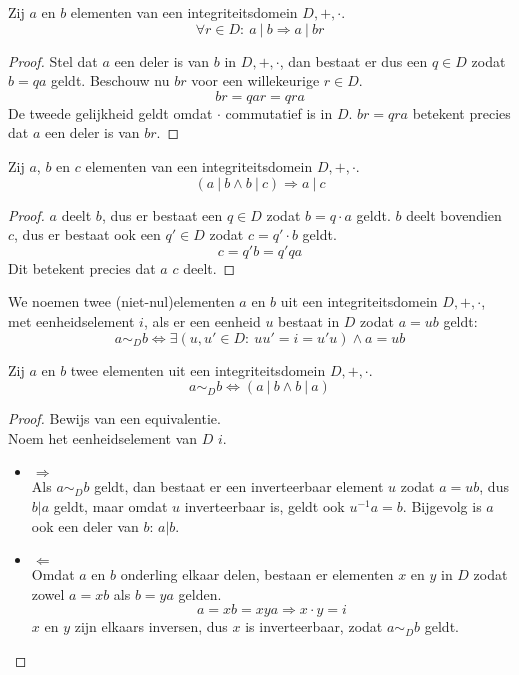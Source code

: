 \documentclass[main.tex]{subfiles}
\begin{document}
\begin{st}
  Zij $a$ en $b$ elementen van een integriteitsdomein $D,+,\cdot$.
  \[ \forall r \in D:\ a\ |\ b \Rightarrow a\ |\ br  \]

  \begin{proof}
    Stel dat $a$ een deler is van $b$ in $D,+,\cdot$, dan bestaat er dus een $q\in D$ zodat $b = qa$ geldt.
    Beschouw nu $br$ voor een willekeurige $r\in D$.
    \[ br = qar = qra \]
    De tweede gelijkheid geldt omdat $\cdot$ commutatief is in $D$.
    $br =qra$ betekent precies dat $a$ een deler is van $br$.
  \end{proof}
\end{st}

\begin{st}
  \label{st:deler-transitief}
  Zij $a$, $b$ en $c$ elementen van een integriteitsdomein $D,+,\cdot$.
  \[ (a\ |\ b \wedge b\ |\ c) \Rightarrow a\ |\ c \]

  \begin{proof}
    $a$ deelt $b$, dus er bestaat een $q \in D$ zodat $b=q\cdot a$ geldt.
    $b$ deelt bovendien $c$, dus er bestaat ook een $q'\in D$ zodat $c = q'\cdot b$ geldt. 
    \[ c = q'b = q'qa \]
    Dit betekent precies dat $a$ $c$ deelt.
  \end{proof}
\end{st}

\begin{de}
  We noemen twee (niet-nul)elementen $a$ en $b$ uit een integriteitsdomein $D,+,\cdot$, met eenheidselement $i$,  als er een eenheid $u$ bestaat in $D$ zodat $a=ub$ geldt:
  \[ a \sim_{D} b \Leftrightarrow \exists (u,u'\in D:\ uu'= i = u'u) \wedge a = ub \]
\end{de}

\begin{st}
  Zij $a$ en $b$ twee elementen uit een integriteitsdomein $D,+,\cdot$.
  \[ a \sim_{D} b \Leftrightarrow (a\ |\ b \wedge b\ |\ a) \]

  \begin{proof}
    Bewijs van een equivalentie.\\
    Noem het eenheidselement van $D$ $i$.
    \begin{itemize}
    \item $\Rightarrow$\\
      Als $a\sim_{D} b$ geldt, dan bestaat er een inverteerbaar element $u$ zodat $a= ub$, dus $b|a$ geldt, maar omdat $u$ inverteerbaar is, geldt ook $u^{-1}a=b$.
      Bijgevolg is $a$ ook een deler van $b$: $a|b$.
    \item $\Leftarrow$\\
      Omdat $a$ en $b$ onderling elkaar delen, bestaan er elementen $x$ en $y$ in $D$ zodat zowel $a=xb$ als $b=ya$ gelden.
      \[ a = xb = xya \Rightarrow x\cdot y = i\]
      $x$ en $y$ zijn elkaars inversen, dus $x$ is inverteerbaar, zodat $a\sim_{D} b$ geldt.
    \end{itemize}
  \end{proof}
\end{st}
\end{document}
